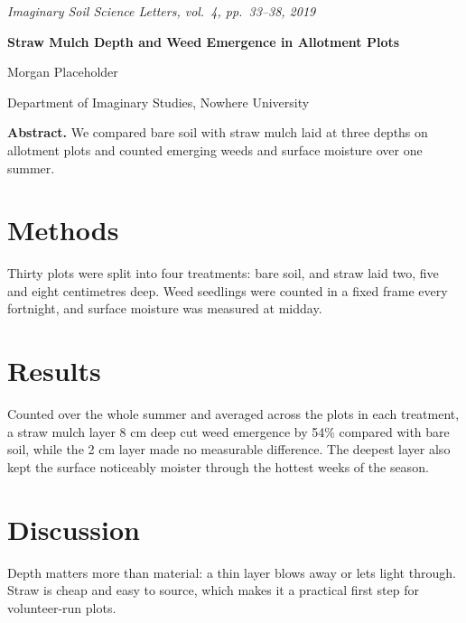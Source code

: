 \documentclass[10pt]{article}
\begin{document}
\begin{center}
{\small\itshape Imaginary Soil Science Letters, vol.~4, pp.~33--38, 2019\par}\vspace{10pt}
{\LARGE\bfseries Straw Mulch Depth and Weed Emergence in Allotment Plots\par}\vspace{8pt}
{\large Morgan Placeholder\par}\vspace{4pt}
{\small Department of Imaginary Studies, Nowhere University\par}
\end{center}
\vspace{6pt}
\noindent\textbf{Abstract.} We compared bare soil with straw mulch laid at three depths on allotment plots and counted emerging weeds and surface moisture over one summer.

\section*{Methods}
Thirty plots were split into four treatments: bare soil, and straw laid two, five and eight centimetres deep. Weed seedlings were counted in a fixed frame every fortnight, and surface moisture was measured at midday.

\section*{Results}
Counted over the whole summer and averaged across the plots in each treatment, a straw mulch layer 8 cm deep cut weed emergence by 54\% compared with bare soil, while the 2 cm layer made no measurable difference. The deepest layer also kept the surface noticeably moister through the hottest weeks of the season.

\section*{Discussion}
Depth matters more than material: a thin layer blows away or lets light through. Straw is cheap and easy to source, which makes it a practical first step for volunteer-run plots.
\end{document}
